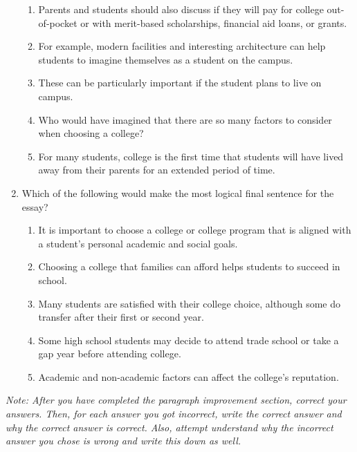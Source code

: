 \begin{enumerate}
\bigskip
\begin{enumerate}[label=(\Alph*)]
\item Parents and students should also discuss if they will pay for college out-of-pocket or with merit-based scholarships, financial aid loans, or grants.
\item For example, modern facilities and interesting architecture can help students to imagine themselves as a student on the campus. 
\item These can be particularly important if the student plans to live on campus. 
\item Who would have imagined that there are so many factors to consider when choosing a college?
\item For many students, college is the first time that students will have lived away from their parents for an extended period of time. 
\end{enumerate}

\bigskip
\item Which of the following would make the most logical final sentence for the essay?

\bigskip
\begin{enumerate}[label=(\Alph*)]
\item It is important to choose a college or college program that is aligned with a student's personal academic and social goals. 
\item Choosing a college that families can afford helps students to succeed in school.
\item Many students are satisfied with their college choice, although some do transfer after their first or second year.
\item Some high school students may decide to attend trade school or take a gap year before attending college. 
\item Academic and non-academic factors can affect the college's reputation. 
\end{enumerate}
\end{enumerate}

\textit{Note: After you have completed the paragraph improvement section, correct your answers. Then, for each answer you got incorrect, write the correct answer and why the correct answer is correct. Also, attempt understand why the incorrect answer you chose is wrong and write this down as well.}